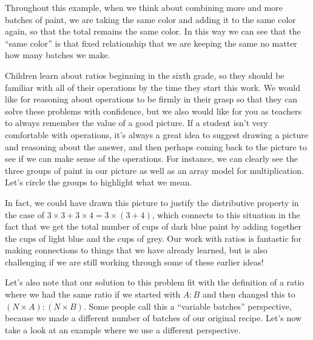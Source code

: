 \documentclass{ximera}
\begin{document}
Throughout this example, when we think about combining more and more batches of paint, we are taking the same color and adding it to the same color again, so that the total remains the same color. In this way we can see that the ``same color'' is that fixed relationship that we are keeping the same no matter how many batches we make.

Children learn about ratios beginning in the sixth grade, so they should be familiar with all of their operations by the time they start this work. We would like for reasoning about operations to be firmly in their grasp so that they can solve these problems with confidence, but we also would like for you as teachers to always remember the value of a good picture. If a student isn't very comfortable with operations, it's always a great idea to suggest drawing a picture and reasoning about the answer, and then perhaps coming back to the picture to see if we can make sense of the operations. For instance, we can clearly see the three groups of paint in our picture as well as an array model for multiplication. Let's circle the groups to highlight what we mean.

\begin{image}
 \end{image}

In fact, we could have drawn this picture to justify the distributive property in the case of $3 \times 3 + 3 \times 4 = 3 \times (3+4)$, which connects to this situation in the fact that we get the total number of cups of dark blue paint by adding together the cups of light blue and the cups of grey. Our work with ratios is fantastic for making connections to things that we have already learned, but is also challenging if we are still working through some of these earlier ideas!

Let's also note that our solution to this problem fit with the definition of a ratio where we had the same ratio if we started with $A:B$ and then changed this to $(N \times A) : (N \times B)$. Some people call this a ``variable batches'' perspective, because we made a different number of batches of our original recipe. Let's now take a look at an example where we use a different perspective.
\end{document}
